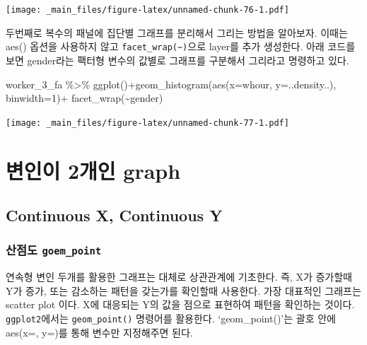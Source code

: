 \documentclass[
]{book}
\newenvironment{Shaded}{\begin{snugshade}}{\end{snugshade}}
\newcommand{\AttributeTok}[1]{\textcolor[rgb]{0.77,0.63,0.00}{#1}}
\newcommand{\DecValTok}[1]{\textcolor[rgb]{0.00,0.00,0.81}{#1}}
\newcommand{\FunctionTok}[1]{\textcolor[rgb]{0.00,0.00,0.00}{#1}}
\newcommand{\NormalTok}[1]{#1}
\newcommand{\SpecialCharTok}[1]{\textcolor[rgb]{0.00,0.00,0.00}{#1}}
\theoremstyle{definition}
\theoremstyle{definition}
\theoremstyle{definition}
\theoremstyle{definition}
\theoremstyle{remark}
\begin{document}
\texttt{[image: \_main\_files/figure-latex/unnamed-chunk-76-1.pdf]}

두번째로 복수의 패널에 집단별 그래프를 분리해서 그리는 방법을 알아보자. 이때는 aes() 옵션을 사용하지 않고 \texttt{facet\_wrap(\textasciitilde{})}으로 layer를 추가 생성한다. 아래 코드를 보면 gender라는 팩터형 변수의 값별로 그래프를 구분해서 그리라고 명령하고 있다.

\begin{Shaded}
\begin{Highlighting}[]
\NormalTok{worker\_3\_fa }\SpecialCharTok{\%\textgreater{}\%} 
  \FunctionTok{ggplot}\NormalTok{()}\SpecialCharTok{+}\FunctionTok{geom\_histogram}\NormalTok{(}\FunctionTok{aes}\NormalTok{(}\AttributeTok{x=}\NormalTok{whour, }\AttributeTok{y=}\NormalTok{..density..), }\AttributeTok{binwidth=}\DecValTok{1}\NormalTok{)}\SpecialCharTok{+}
  \FunctionTok{facet\_wrap}\NormalTok{(}\SpecialCharTok{\textasciitilde{}}\NormalTok{gender)}
\end{Highlighting}
\end{Shaded}

\texttt{[image: \_main\_files/figure-latex/unnamed-chunk-77-1.pdf]}

\hypertarget{uxbcc0uxc778uxc774-2uxac1cuxc778-graph}{%
\section{변인이 2개인 graph}\label{uxbcc0uxc778uxc774-2uxac1cuxc778-graph}}

\hypertarget{continuous-x-continuous-y}{%
\subsection{Continuous X, Continuous Y}\label{continuous-x-continuous-y}}

\hypertarget{uxc0b0uxc810uxb3c4-goem_point}{%
\subsubsection{\texorpdfstring{산점도 \texttt{goem\_point}}{산점도 goem\_point}}\label{uxc0b0uxc810uxb3c4-goem_point}}

연속형 변인 두개를 활용한 그래프는 대체로 상관관계에 기초한다. 즉, X가 증가할때 Y가 증가, 또는 감소하는 패턴을 갖는가를 확인할때 사용한다. 가장 대표적인 그래프는 scatter plot 이다. X에 대응되는 Y의 값을 점으로 표현하여 패턴을 확인하는 것이다. \texttt{ggplot2}에서는 \texttt{geom\_point()} 명령어를 활용한다. `geom\_point()'는 괄호 안에 aes(x=, y=)를 통해 변수만 지정해주면 된다.
\end{document}
